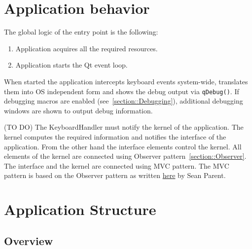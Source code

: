 \documentclass{article}
\begin{document}
\section{Application behavior}

The global logic of the entry point is the following:
\begin{enumerate}
\item Application acquires all the required resources.
\item Application starts the Qt event loop.
\end{enumerate}

When started the application intercepts keyboard events system-wide, translates them into OS independent form and shows the debug output via \verb"qDebug()". If debugging macros are enabled (see~\ref{section::Debugging}), additional debugging windows are shown to output debug information.

(TO DO) The KeyboardHandler must notify the kernel of the application. The kernel computes the required information and notifies the interface of the application. From the other hand the interface elements control the kernel. All elements of the kernel are connected using Observer pattern~\ref{section::Observer}. The interface and the kernel are connected using MVC pattern. The MVC pattern is based on the Observer pattern as written \href{https://stlab.cc/tips/about-mvc.html}{here} by Sean Parent.

\section{Application Structure}

\subsection{Overview}
\end{document}
